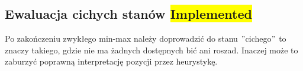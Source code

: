 \subsection{Ewaluacja cichych stanów \colorbox{yellow}{Implemented}}
\label{subsec:ewaluacja-cichych-stanow}

{
    \color{red}
    \large Po zakończeniu zwykłego min-max należy doprowadzić do stanu \("\)cichego\("\) to znaczy takiego, gdzie nie ma żadnych dostępnych bić ani roszad.
Inaczej może to zaburzyć poprawną interpretację pozycji przez heurystykę.
}